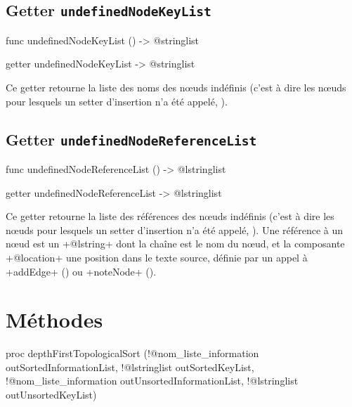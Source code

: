 \subsection{Getter \texttt{undefinedNodeKeyList}}

\begin{galgas4}
func undefinedNodeKeyList () -> @stringlist
\end{galgas4}

\begin{galgas3}
getter undefinedNodeKeyList -> @stringlist
\end{galgas3}

Ce getter retourne la liste des noms des nœuds indéfinis (c'est à dire les nœuds pour lesquels un setter d'insertion n'a été appelé, ).








\subsection{Getter \texttt{undefinedNodeReferenceList}}

\begin{galgas4}
func undefinedNodeReferenceList () -> @lstringlist
\end{galgas4}

\begin{galgas3}
getter undefinedNodeReferenceList -> @lstringlist
\end{galgas3}

Ce getter retourne la liste des références des nœuds indéfinis (c'est à dire les nœuds pour lesquels un setter d'insertion n'a été appelé, ). Une référence à un nœud est un \ggst+@lstring+ dont la chaîne est le nom du nœud, et la composante \ggst+@location+ une position dans le texte source, définie par un appel à \ggst+addEdge+ () ou \ggst+noteNode+ ().




\section{Méthodes}


\begin{galgas4}
proc depthFirstTopologicalSort (!@nom_liste_information outSortedInformationList,
                             !@lstringlist outSortedKeyList,
                             !@nom_liste_information outUnsortedInformationList,
                             !@lstringlist outUnsortedKeyList)
\end{galgas4}

